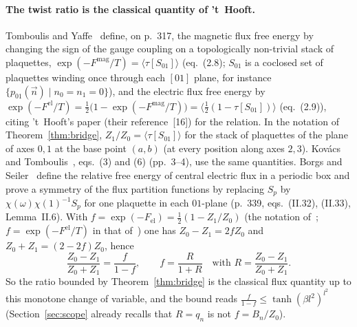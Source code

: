 \documentclass[11pt,a4paper]{article}
\theoremstyle{plain}
\theoremstyle{definition}
\theoremstyle{remark}
\numberwithin{equation}{section}
\begin{document}
\paragraph{The twist ratio is the classical quantity of 't~Hooft.} Tomboulis and Yaffe~\cite{TY85} define, on p.~317, the magnetic flux free energy by changing the sign of the gauge coupling on a topologically non-trivial stack of plaquettes, $\exp(-F^{\mathrm{mag}}/T)=\langle\tau[S_{01}]\rangle$ (eq.~(2.8); $S_{01}$ is a coclosed set of plaquettes winding once through each $[01]$ plane, for instance $\{p_{01}(\vec n)\mid n_0=n_1=0\}$), and the electric flux free energy by $\exp(-F^{\mathrm{el}}/T)=\frac12\bigl(1-\exp(-F^{\mathrm{mag}}/T)\bigr)=\langle\frac12(1-\tau[S_{01}])\rangle$ (eq.~(2.9)), citing 't~Hooft's paper (their reference~[16]) for the relation. In the notation of Theorem~\ref{thm:bridge}, $Z_1/Z_0=\langle\tau[S_{01}]\rangle$ for the stack of plaquettes of the plane of axes $0,1$ at the base point $(a,b)$ (at every position along axes $2,3$). Kov\'acs and Tomboulis~\cite{KT02}, eqs.~(3) and (6) (pp.~3--4), use the same quantities. Borgs and Seiler~\cite{BS83} define the relative free energy of central electric flux in a periodic box and prove a symmetry of the flux partition functions by replacing $S_p$ by $\chi(\omega)\chi(1)^{-1}S_p$ for one plaquette in each $01$-plane (p.~339, eqs.~(II.32), (II.33), Lemma~II.6). With $f=\exp(-F_{\mathrm{el}})=\frac12(1-Z_1/Z_0)$ (the notation of~\cite{KT02}; $f=\exp(-F^{\mathrm{el}}/T)$ in that of~\cite{TY85}) one has $Z_0-Z_1=2fZ_0$ and $Z_0+Z_1=(2-2f)Z_0$, hence
\[
\frac{Z_0-Z_1}{Z_0+Z_1}=\frac{f}{1-f},\qquad f=\frac{R}{1+R}\quad\text{with }R=\frac{Z_0-Z_1}{Z_0+Z_1}.
\]
So the ratio bounded by Theorem~\ref{thm:bridge} is the classical flux quantity up to this monotone change of variable, and the bound reads $\frac{f}{1-f}\le\tanh(\beta l^2)^{l^2}$ (Section~\ref{sec:scope} already recalls that $R=q_n$ is not $f=B_n/Z_0$).
\end{document}
